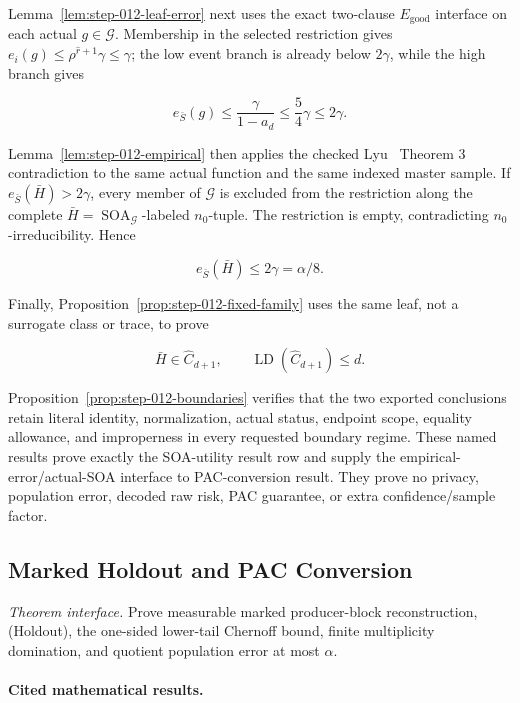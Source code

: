Lemma~\ref{lem:step-012-leaf-error} next uses the exact two-clause
\(E_{\mathrm{good}}\) interface on each actual
\(g\in\mathcal G\). Membership in the selected restriction gives
\(e_i(g)\le\rho^{\widehat r+1}\gamma\le\gamma\); the low event branch is
already below \(2\gamma\), while the high branch gives

\[
 e_{\bar S}(g)
 \le\frac{\gamma}{1-a_d}
 \le\frac54\gamma
 \le2\gamma.
\]

Lemma~\ref{lem:step-012-empirical} then applies the checked Lyu~\citep{lyu2025} Theorem 3
contradiction to the same actual function and the same indexed master
sample. If \(e_{\bar S}(\bar H)>2\gamma\), every member of
\(\mathcal G\) is excluded from the restriction along the complete
\(\bar H=\operatorname{SOA}_{\mathcal G}\)-labeled \(n_0\)-tuple. The
restriction is empty, contradicting \(n_0\)-irreducibility. Hence

\[
 e_{\bar S}(\bar H)\le2\gamma=\alpha/8.
\]

Finally, Proposition~\ref{prop:step-012-fixed-family} uses the same leaf,
not a surrogate class or trace, to prove

\[
 \bar H\in\widehat C_{d+1},
 \qquad
 \operatorname{LD}(\widehat C_{d+1})\le d.
\]

Proposition~\ref{prop:step-012-boundaries} verifies that the two exported
conclusions retain literal identity, normalization, actual status, endpoint
scope, equality allowance, and improperness in every requested boundary
regime. These named results prove exactly the  SOA-utility result row and
supply the empirical-error/actual-SOA interface to PAC-conversion result. They prove
no privacy, population error, decoded raw risk, PAC guarantee, or extra
confidence/sample factor.



\subsection{Marked Holdout and PAC Conversion}\label{app:step_013}

\noindent\textit{Theorem interface.} Prove measurable marked producer-block reconstruction,   (Holdout), the one-sided lower-tail Chernoff bound, finite multiplicity   domination, and quotient population error at most \(\alpha\).

\paragraph{Cited mathematical results.}


